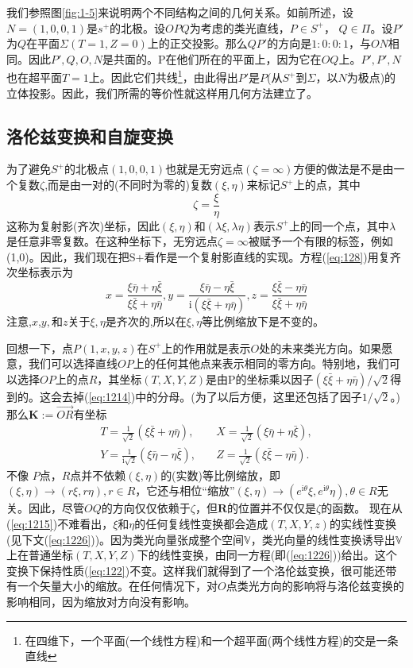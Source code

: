 \documentclass[utf8]{ctexbook}
\numberwithin{equation}{section}
\begin{document}
我们参照图\ref{fig:1-5}来说明两个不同结构之间的几何关系。如前所述，设$N=(1,0,0,1)$是$s^+$的北极。设$OPQ$为考虑的类光直线，$P\in S^+$， $Q\in \Pi$。设$P'$为$Q$在平面$\Sigma(T= 1,Z=0)$上的正交投影。那么$QP'$的方向是$1:0:0:1$，与$ON$相同。因此$P',Q, O, N$是共面的。P在他们所在的平面上，因为它在$OQ$上。$P',P',N$也在超平面$T =1$上。因此它们共线\footnote{在四维下，一个平面(一个线性方程)和一个超平面(两个线性方程)的交是一条直线}，由此得出$P'$是$P$(从$S^+$到$\Sigma$，以$N$为极点)的立体投影。因此，我们所需的等价性就这样用几何方法建立了。
\subsection*{洛伦兹变换和自旋变换}
为了避免$S^+$的北极点$(1,0,0,1)$也就是无穷远点$(\zeta=\infty)$方便的做法是不是由一个复数$\zeta$,而是由一对的(不同时为零的)复数$(\xi,\eta)$来标记$S^+$上的点，其中
\begin{equation}
    \zeta = \frac{\xi}{\eta}\label{eq:1213}
\end{equation}
这称为复射影(齐次)坐标，因此$(\xi,\eta)$和$(\lambda\xi,\lambda\eta)$表示$S^+$上的同一个点，其中$\lambda$是任意非零复数。在这种坐标下，无穷远点$\zeta=\infty $被赋予一个有限的标签，例如(1,0)。因此，我们现在把S+看作是一个复射影直线的实现。方程(\ref{eq:128})用复齐次坐标表示为
\begin{equation}
    x=\frac{\xi\bar{\eta}+\eta\bar{\xi}}{\xi\bar{\xi}+\eta\bar{\eta}},y=\frac{\xi\bar{\eta}-\eta\bar{\xi}}{\mathrm{i}(\xi\bar{\xi}+\eta\bar{\eta})},z=\frac{\xi\bar{\xi}-\eta\bar{\eta}}{\xi\bar{\xi}+\eta\bar{\eta}}\label{eq:1214}
\end{equation}
注意,$x$,$y,$和$z$关于$\xi,\eta$是齐次的,所以在$\xi,\eta$等比例缩放下是不变的。

回想一下，点$P(1, x, y, z)$在$S^+$上的作用就是表示$O$处的未来类光方向。如果愿意，我们可以选择直线$OP$上的任何其他点来表示相同的零方向。特别地，我们可以选择$OP$上的点$R$，其坐标$(T, X, Y, Z)$是由P的坐标乘以因子$(\xi\bar{\xi}+\eta\bar{\eta})/\sqrt{2}$得到的。这会去掉(\ref{eq:1214})中的分母。(为了以后方便，这里还包括了因子$1/\sqrt{2}$。)那么$\mathbf{K}:=\overrightarrow{OR}$有坐标
\begin{align}
    T=\frac{1}{\sqrt{2}}(\xi\bar{\xi}+\eta\bar{\eta}),\quad &X=\frac{1}{\sqrt{2}}(\xi\bar{\eta}+\eta\bar{\xi}),\nonumber\\
    Y=\frac{1}{\mathrm{i}\sqrt{2}}(\xi\bar{\eta}-\eta\bar{\xi}),\quad&Z=\frac{1}{\sqrt{2}}(\xi\bar{\xi}-\eta\bar{\eta}).\label{eq:1215}
\end{align}
不像 $P$点，$R$点并不依赖$(\xi,\eta)$的(实数)等比例缩放，即$(\xi,\eta)→(r\xi,r\eta),r\in R$，它还与相位“缩放”$(\xi,\eta)→(e^{\mathrm{i}\theta}\xi,e^{\mathrm{i}\theta}\eta),\theta\in R$无关。因此，尽管$OQ$的方向仅仅依赖于$\zeta$，但$\mathbf{R}$的位置并不仅仅是$\zeta$的函数。
现在从(\ref{eq:1215})不难看出，$\xi$和$\eta$的任何复线性变换都会造成$(T, X, Y, z)$的实线性变换(见下文(\ref{eq:1226}))。因为类光向量张成整个空间$\mathbb{V}$，类光向量的线性变换诱导出$\mathbb{V}$上在普通坐标$(T, X, Y, Z)$下的线性变换，由同一方程(即(\ref{eq:1226}))给出。这个变换下保持性质(\ref{eq:122})不变。这样我们就得到了一个洛伦兹变换，很可能还带有一个矢量大小的缩放。在任何情况下，对$O$点类光方向的影响将与洛伦兹变换的影响相同，因为缩放对方向没有影响。
\end{document}
